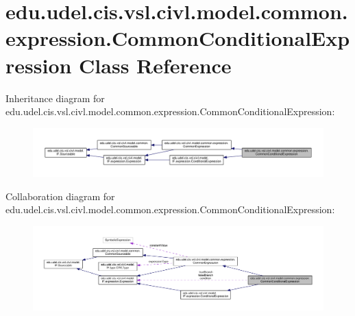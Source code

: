 \hypertarget{classedu_1_1udel_1_1cis_1_1vsl_1_1civl_1_1model_1_1common_1_1expression_1_1CommonConditionalExpression}{}\section{edu.\+udel.\+cis.\+vsl.\+civl.\+model.\+common.\+expression.\+Common\+Conditional\+Expression Class Reference}
\label{classedu_1_1udel_1_1cis_1_1vsl_1_1civl_1_1model_1_1common_1_1expression_1_1CommonConditionalExpression}


Inheritance diagram for edu.\+udel.\+cis.\+vsl.\+civl.\+model.\+common.\+expression.\+Common\+Conditional\+Expression\+:
\nopagebreak
\begin{figure}[H]
\begin{center}
\leavevmode
\includegraphics[width=350pt]{classedu_1_1udel_1_1cis_1_1vsl_1_1civl_1_1model_1_1common_1_1expression_1_1CommonConditionalExpression__inherit__graph}
\end{center}
\end{figure}


Collaboration diagram for edu.\+udel.\+cis.\+vsl.\+civl.\+model.\+common.\+expression.\+Common\+Conditional\+Expression\+:
\nopagebreak
\begin{figure}[H]
\begin{center}
\leavevmode
\includegraphics[width=350pt]{classedu_1_1udel_1_1cis_1_1vsl_1_1civl_1_1model_1_1common_1_1expression_1_1CommonConditionalExpression__coll__graph}
\end{center}
\end{figure}

